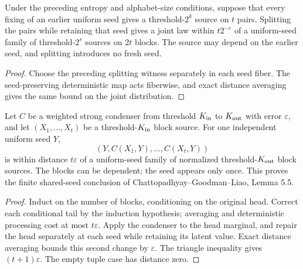 \begin{theorem}
  \label{thm:lowerbounds-algebraic-block-split-family}
  \leanok
  Under the preceding entropy and alphabet-size conditions, suppose that
  every fixing of an earlier uniform seed gives a threshold-$2^k$ source
  on $t$ pairs. Splitting the pairs while retaining that seed gives a joint
  law within $t2^{-e}$ of a uniform-seed family of threshold-$2^s$ sources
  on $2t$ blocks. The source may depend on the earlier seed, and splitting
  introduces no fresh seed.
\end{theorem}
\begin{proof}
  \leanok
  Choose the preceding splitting witness separately in each seed fiber.
  The seed-preserving deterministic map acts fiberwise, and exact distance
  averaging gives the same bound on the joint distribution.
\end{proof}

\begin{theorem}
  \label{thm:lowerbounds-algebraic-block-condenser}
  \leanok
  Let $C$ be a weighted strong condenser from threshold $K_{\rm in}$ to
  $K_{\rm out}$ with error $\varepsilon$, and let $(X_1,\ldots,X_t)$ be a
  threshold-$K_{\rm in}$ block source. For one independent uniform seed $Y$,
  \[
    (Y,C(X_1,Y),\ldots,C(X_t,Y))
  \]
  is within distance $t\varepsilon$ of a uniform-seed family of normalized
  threshold-$K_{\rm out}$ block sources. The blocks can be dependent;
  the seed appears only once. This proves the finite shared-seed conclusion
  of Chattopadhyay--Goodman--Liao, Lemma 5.5.
\end{theorem}
\begin{proof}
  \leanok
  Induct on the number of blocks, conditioning on the original head.
  Correct each conditional tail by the induction hypothesis; averaging
  and deterministic processing cost at most $t\varepsilon$. Apply the
  condenser to the head marginal, and repair the head separately at each
  seed while retaining its latent value. Exact distance averaging bounds
  this second change by $\varepsilon$. The triangle inequality gives
  $(t+1)\varepsilon$. The empty tuple case has distance zero.
\end{proof}

